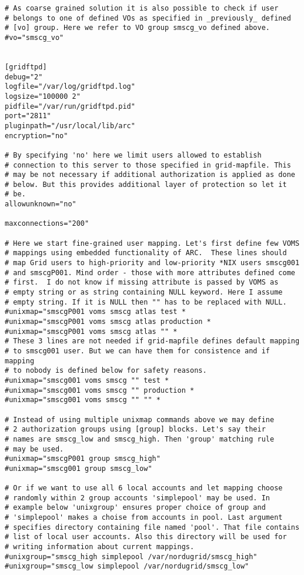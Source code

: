 \documentclass{article}
\begin{document}
\begin{verbatim}
# As coarse grained solution it is also possible to check if user 
# belongs to one of defined VOs as specified in _previously_ defined
# [vo] group. Here we refer to VO group smscg_vo defined above.
#vo="smscg_vo"


[gridftpd]
debug="2"
logfile="/var/log/gridftpd.log"
logsize="100000 2"
pidfile="/var/run/gridftpd.pid"
port="2811"
pluginpath="/usr/local/lib/arc"
encryption="no"

# By specifying 'no' here we limit users allowed to establish
# connection to this server to those specified in grid-mapfile. This
# may be not necessary if additional authorization is applied as done
# below. But this provides additional layer of protection so let it
# be.
allowunknown="no"

maxconnections="200"

# Here we start fine-grained user mapping. Let's first define few VOMS
# mappings using embedded functionality of ARC.  These lines should
# map Grid users to high-priority and low-priority *NIX users smscg001
# and smscgP001. Mind order - those with more attributes defined come
# first.  I do not know if missing attribute is passed by VOMS as
# empty string or as string containing NULL keyword. Here I assume
# empty string. If it is NULL then "" has to be replaced with NULL.
#unixmap="smscgP001 voms smscg atlas test *
#unixmap="smscgP001 voms smscg atlas production *
#unixmap="smscgP001 voms smscg atlas "" *
# These 3 lines are not needed if grid-mapfile defines default mapping
# to smscg001 user. But we can have them for consistence and if mapping
# to nobody is defined below for safety reasons.
#unixmap="smscg001 voms smscg "" test *
#unixmap="smscg001 voms smscg "" production *
#unixmap="smscg001 voms smscg "" "" *

# Instead of using multiple unixmap commands above we may define 
# 2 authorization groups using [group] blocks. Let's say their
# names are smscg_low and smscg_high. Then 'group' matching rule
# may be used. 
#unixmap="smscgP001 group smscg_high"
#unixmap="smscg001 group smscg_low"

# Or if we want to use all 6 local accounts and let mapping choose
# randomly within 2 group accounts 'simplepool' may be used. In
# example below 'unixgroup' ensures proper choice of group and
# 'simplepool' makes a choise from accounts in pool. Last argument
# specifies directory containing file named 'pool'. That file contains
# list of local user accounts. Also this directory will be used for
# writing information about current mappings.
#unixgroup="smscg_high simplepool /var/nordugrid/smscg_high"
#unixgroup="smscg_low simplepool /var/nordugrid/smscg_low"


\end{verbatim}
\end{document}
